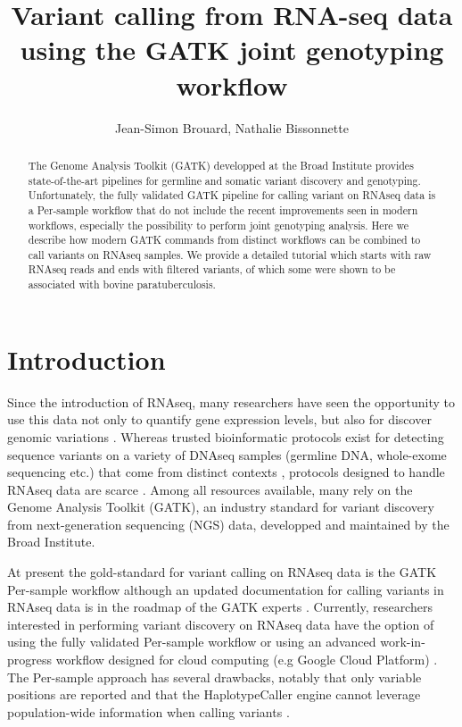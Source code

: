 \documentclass[]{article}
\title{Variant calling from RNA-seq data using the GATK joint genotyping workflow}
\author{Jean-Simon Brouard, Nathalie Bissonnette}
\begin{document}
\maketitle

\begin{abstract}
	
The Genome Analysis Toolkit (GATK) developped at the Broad Institute provides state-of-the-art pipelines for germline and somatic variant discovery and genotyping. Unfortunately, the fully validated GATK pipeline for calling variant on RNAseq data is a Per-sample workflow that do not include the recent improvements seen in modern workflows, especially the possibility to perform joint genotyping analysis. Here we describe how modern GATK commands from distinct workflows can be combined to call variants on RNAseq samples. We provide a detailed tutorial which starts with raw RNAseq reads and ends with filtered variants, of which some were shown to be associated with bovine paratuberculosis.

\end{abstract}

\section{Introduction}
Since the introduction of RNAseq, many researchers have seen the opportunity to use this data not only to quantify gene expression levels, but also for discover genomic variations \cite{Piskol2013}. Whereas trusted bioinformatic protocols exist for detecting sequence variants on a variety of DNAseq samples (germline DNA, whole-exome sequencing etc.) that come from distinct contexts \cite{Koboldt2020}, protocols designed to handle RNAseq data are scarce \cite{Piskol2013}. Among all resources available, many rely on the Genome Analysis Toolkit (GATK), an industry standard for variant discovery from next-generation sequencing (NGS) data, developped and maintained by the Broad Institute.

At present the gold-standard for variant calling on RNAseq data is the GATK Per-sample workflow although an updated documentation for calling variants in RNAseq data is in the roadmap of the GATK experts \cite{GATK_best_RNAseq}. Currently, researchers interested in performing variant discovery on RNAseq data have the option of using the fully validated Per-sample workflow \cite{GATK_RNAseq_variant_discovery} or using an advanced work-in-progress workflow designed for cloud computing (e.g Google Cloud Platform) \cite{GATK_gatk4_rnaseq_github}. The Per-sample approach has several drawbacks, notably that only variable positions are reported and that the HaplotypeCaller engine cannot leverage population-wide information when calling variants \cite{Brouard2019, GATK_RNAseq_variant_discovery}.
\end{document}
